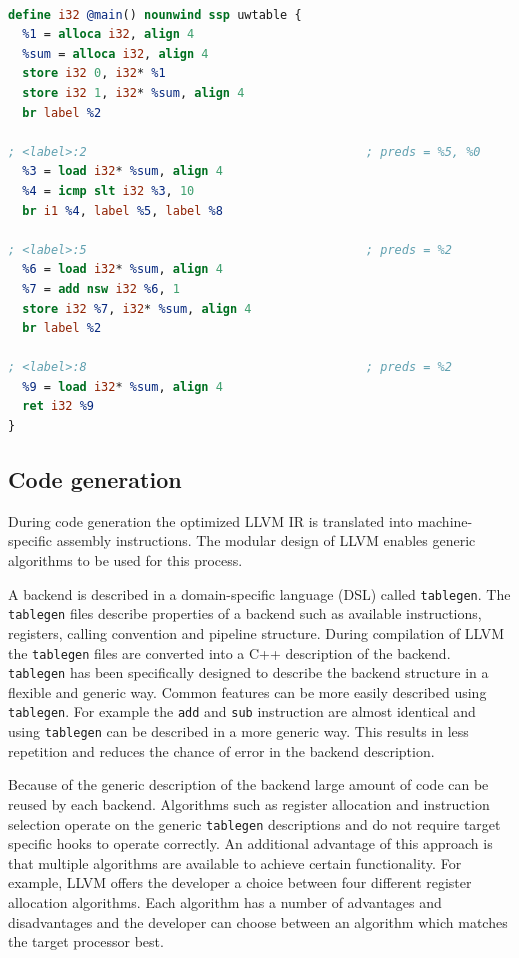 \lstset{numbers=none, captionpos=b}
\begin{lstlisting}[language=llvm,caption={LLVM Intermediate representation},label=lst:LLVM_IR]

define i32 @main() nounwind ssp uwtable {
  %1 = alloca i32, align 4
  %sum = alloca i32, align 4
  store i32 0, i32* %1
  store i32 1, i32* %sum, align 4
  br label %2

; <label>:2                                       ; preds = %5, %0
  %3 = load i32* %sum, align 4
  %4 = icmp slt i32 %3, 10
  br i1 %4, label %5, label %8

; <label>:5                                       ; preds = %2
  %6 = load i32* %sum, align 4
  %7 = add nsw i32 %6, 1
  store i32 %7, i32* %sum, align 4
  br label %2

; <label>:8                                       ; preds = %2
  %9 = load i32* %sum, align 4
  ret i32 %9
}

\end{lstlisting}

\subsection{Code generation}
During code generation the optimized LLVM IR is translated into machine-specific assembly instructions. The modular design of LLVM enables generic algorithms to be used for this process. 

A backend is described in a domain-specific language (DSL) called \texttt{tablegen}. The \texttt{tablegen} files describe properties of a backend such as available instructions, registers, calling convention and pipeline structure. During compilation of LLVM the \texttt{tablegen} files are converted into a C++ description of the backend. \texttt{tablegen} has been specifically designed to describe the backend structure in a flexible and generic way. Common features can be more easily described using \texttt{tablegen}. For example the \texttt{add} and \texttt{sub} instruction are almost identical and using \texttt{tablegen} can be described in a more generic way. This results in less repetition and reduces the chance of error in the backend description.

Because of the generic description of the backend large amount of code can be reused by each backend. Algorithms such as register allocation and instruction selection operate on the generic \texttt{tablegen} descriptions and do not require target specific hooks to operate correctly. An additional advantage of this approach is that multiple algorithms are available to achieve certain functionality. For example, LLVM offers the developer a choice between four different register allocation algorithms. Each algorithm has a number of advantages and disadvantages and the developer can choose between an algorithm which matches the target processor best.

